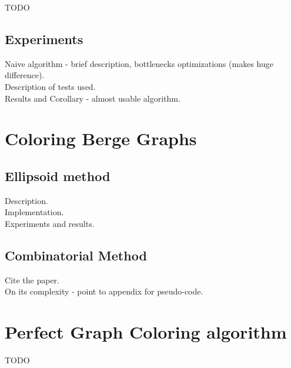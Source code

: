 \documentclass{report}
\begin{document}
TODO

\section{Experiments}

Naive algorithm - brief description, bottlenecks optimizations (makes huge difference).\\

Description of tests used.\\

Results and Corollary - almost usable algorithm.



\chapter{Coloring Berge Graphs}

\section{Ellipsoid method}

Description.\\

Implementation.\\

Experiments and results.\\

\section{Combinatorial Method}

Cite the paper.\\

On its complexity - point to appendix for pseudo-code.

\appendix
\appendixpage
\addappheadtotoc

\chapter{Perfect Graph Coloring algorithm}
TODO


% 
\printbibliography
\end{document}
